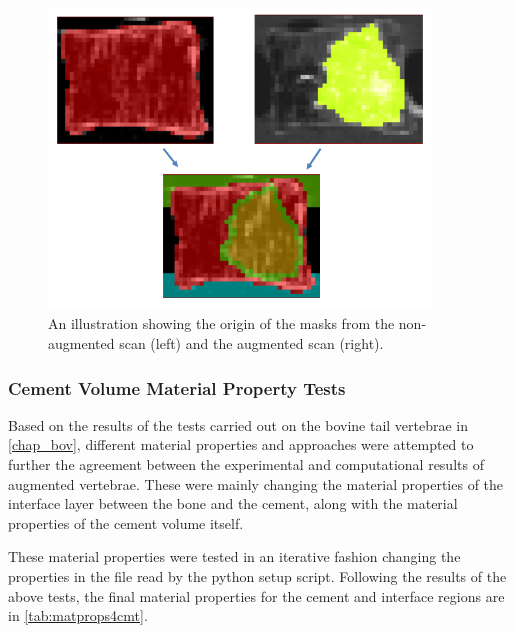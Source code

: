 \begin{figure}[ht!]
  \centering
  \includegraphics[width=4in]{Chapters/Chapter_HT_images/mask_demo.png}
  \caption{An illustration showing the origin of the masks from the non-augmented scan (left) and the augmented scan (right).}
  \label{fig:mask_demo}
\end{figure}


\subsubsection{Cement Volume Material Property Tests}

Based on the results of the tests carried out on the bovine tail vertebrae in
\cref{chap_bov}, different material properties and approaches were attempted to
further the agreement between the experimental and computational results of
augmented vertebrae.  These were mainly changing the material properties of the
interface layer between the bone and the cement, along with the material
properties of the cement volume itself.

These material properties were tested in an iterative fashion changing the
properties in the file read by the python setup script.
Following the results of the above tests, the final material properties for the
cement and interface regions are in \cref{tab:matprops4cmt}.

